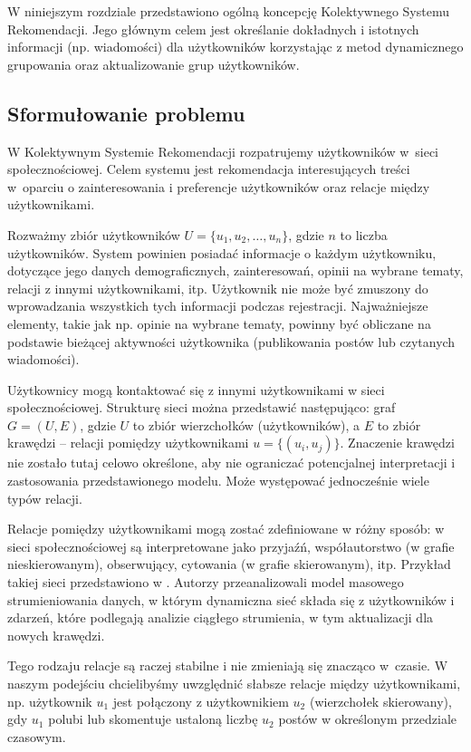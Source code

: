 W niniejszym rozdziale przedstawiono ogólną koncepcję Kolektywnego Systemu Rekomendacji. Jego głównym celem jest określanie dokładnych i istotnych informacji (np. wiadomości) dla użytkowników korzystając z metod dynamicznego grupowania oraz aktualizowanie grup użytkowników.


\subsection{Sformułowanie problemu}

W Kolektywnym Systemie Rekomendacji rozpatrujemy użytkowników w~sieci społecznościowej. Celem systemu jest rekomendacja interesujących treści w~oparciu o zainteresowania i preferencje użytkowników oraz relacje między użytkownikami.

Rozważmy zbiór użytkowników $U=\{u_1, u_2, \ldots, u_n\}$, gdzie $n$ to liczba użytkowników. System powinien posiadać informacje o każdym użytkowniku, dotyczące jego danych demograficznych, zainteresowań, opinii na wybrane tematy, relacji z innymi użytkownikami, itp. Użytkownik nie może być zmuszony do wprowadzania wszystkich tych informacji podczas rejestracji. Najważniejsze elementy, takie jak np. opinie na wybrane tematy, powinny być obliczane na podstawie bieżącej aktywności użytkownika (publikowania postów lub czytanych wiadomości).

Użytkownicy mogą kontaktować się z innymi użytkownikami w sieci społecznościowej. Strukturę sieci można przedstawić następująco: graf $G = (U, E)$, gdzie $U$ to zbiór wierzchołków (użytkowników), a $E$ to zbiór krawędzi -- relacji pomiędzy użytkownikami $u=\{(u_i, u_j)\}$. Znaczenie krawędzi nie zostało tutaj celowo określone, aby nie ograniczać potencjalnej interpretacji i zastosowania przedstawionego modelu. Może występować jednocześnie wiele typów relacji.

Relacje pomiędzy użytkownikami mogą zostać zdefiniowane w różny sposób: w sieci społecznościowej są interpretowane jako przyjaźń, współautorstwo (w grafie nieskierowanym), obserwujący, cytowania (w grafie skierowanym), itp. Przykład takiej sieci przedstawiono w \cite{fairbanks}. Autorzy przeanalizowali model masowego strumieniowania danych, w którym dynamiczna sieć składa się z użytkowników i zdarzeń, które podlegają analizie ciągłego strumienia, w tym aktualizacji dla nowych krawędzi.

Tego rodzaju relacje są raczej stabilne i nie zmieniają się znacząco w~czasie. W naszym podejściu chcielibyśmy uwzględnić słabsze relacje między użytkownikami, np. użytkownik $u_1$ jest połączony z użytkownikiem $u_2$ (wierzchołek skierowany), gdy $u_1$ polubi lub skomentuje ustaloną liczbę $u_2$ postów w określonym przedziale czasowym.

